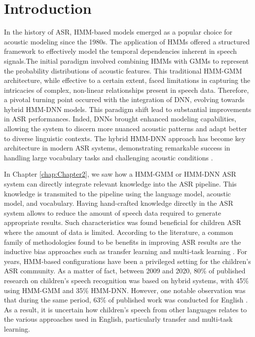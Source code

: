 \label{chap:Chapter3}
\cleardoublepage
\section{Introduction}
In the history of ASR, HMM-based models emerged as a popular choice for acoustic modeling since the 1980s. The application of HMMs offered a structured framework to effectively model the temporal dependencies inherent in speech signals.The initial paradigm involved combining HMMs with GMMs to represent the probability distributions of acoustic features. This traditional HMM-GMM architecture, while effective to a certain extent, faced limitations in capturing the intricacies of complex, non-linear relationships present in speech data. Therefore, a pivotal turning point occurred with the integration of DNN, evolving towards hybrid HMM-DNN models. This paradigm shift lead to substantial improvements in ASR performances. Inded, DNNs brought enhanced modeling capabilities, allowing the system to discern more nuanced acoustic patterns and adapt better to diverse linguistic contexts. The hybrid HMM-DNN approach has become key architecture in modern ASR systems, demonstrating remarkable success in handling large vocabulary tasks and challenging acoustic conditions \cite{!!}. 

In Chapter \ref{chap:Chapter2}, we saw how a HMM-GMM or HMM-DNN ASR system can directly integrate relevant knowledge into the ASR pipeline. This knowledge is transmited to the pipeline using the language model, acoustic model, and vocabulary. Having hand-crafted knowledge directly in the ASR system allows to reduce the amount of speech data required to generate appropriate results. Such characteristics was found beneficial for children ASR where the amount of data is limited. According to the literature, a common family of methodologies  found to be benefits in improving ASR results are the inductive bias approaches such as transfer learning and multi-task learning \cite{TransferLF}. For years, HMM-based configurations have been a privileged setting for the children's ASR community. As a matter of fact, between 2009 and 2020, 80\% of published research on children's speech recognition was based on hybrid systems, with 45\% using HMM-GMM and 35\% HMM-DNN. However, one notable observation was that during the same period, 63\% of published work was conducted for English \cite{big_review_childASR}. As a result, it is uncertain how children's speech from other languages relates to the various approaches used in English, particularly transfer and multi-task learning.

